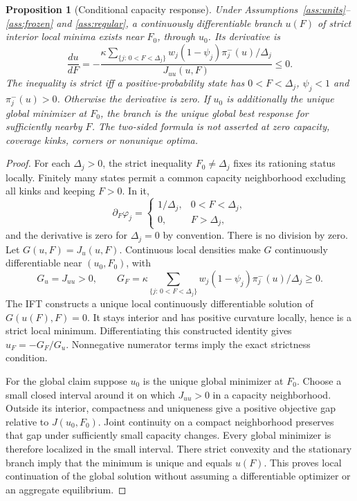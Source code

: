 \documentclass[11pt]{article}
\newtheorem{proposition}{Proposition}
\theoremstyle{definition}
\begin{document}
\begin{proposition}[Conditional capacity response]\label{prop:capacity}
Under Assumptions~\ref{ass:units}--\ref{ass:frozen} and \ref{ass:regular}, a continuously differentiable branch $u(F)$ of strict interior local minima exists near $F_0$, through $u_0$. Its derivative is
\begin{equation}\label{eq:capacityderivative}
 \frac{du}{dF}=
 -\frac{\displaystyle\kappa\sum_{\{j:\,0<F<\Delta_j\}}
  w_j(1-\psi_j)\pi^-_j(u)/\Delta_j}{J_{uu}(u,F)}
 \leq0.
\end{equation}
The inequality is strict iff a positive-probability state has $0<F<\Delta_j$, $\psi_j<1$ and $\pi^-_j(u)>0$. Otherwise the derivative is zero. If $u_0$ is additionally the unique global minimizer at $F_0$, the branch is the unique global best response for sufficiently nearby $F$. The two-sided formula is not asserted at zero capacity, coverage kinks, corners or nonunique optima.
\end{proposition}

\begin{proof}
For each $\Delta_j>0$, the strict inequality $F_0\ne\Delta_j$ fixes its rationing status locally. Finitely many states permit a common capacity neighborhood excluding all kinks and keeping $F>0$. In it,
\[
 \partial_F\varphi_j=
 \begin{cases}1/\Delta_j,&0<F<\Delta_j,\\0,&F>\Delta_j,\end{cases}
\]
and the derivative is zero for $\Delta_j=0$ by convention. There is no division by zero. Let $G(u,F)=J_u(u,F)$. Continuous local densities make $G$ continuously differentiable near $(u_0,F_0)$, with
\[
 G_u=J_{uu}>0,\qquad
 G_F=\kappa\sum_{\{j:\,0<F<\Delta_j\}}w_j(1-\psi_j)\pi^-_j(u)/\Delta_j\geq0.
\]
The IFT constructs a unique local continuously differentiable solution of $G(u(F),F)=0$. It stays interior and has positive curvature locally, hence is a strict local minimum. Differentiating this constructed identity gives $u_F=-G_F/G_u$. Nonnegative numerator terms imply the exact strictness condition.

For the global claim suppose $u_0$ is the unique global minimizer at $F_0$. Choose a small closed interval around it on which $J_{uu}>0$ in a capacity neighborhood. Outside its interior, compactness and uniqueness give a positive objective gap relative to $J(u_0,F_0)$. Joint continuity on a compact neighborhood preserves that gap under sufficiently small capacity changes. Every global minimizer is therefore localized in the small interval. There strict convexity and the stationary branch imply that the minimum is unique and equals $u(F)$. This proves local continuation of the global solution without assuming a differentiable optimizer or an aggregate equilibrium.
\end{proof}
\end{document}
